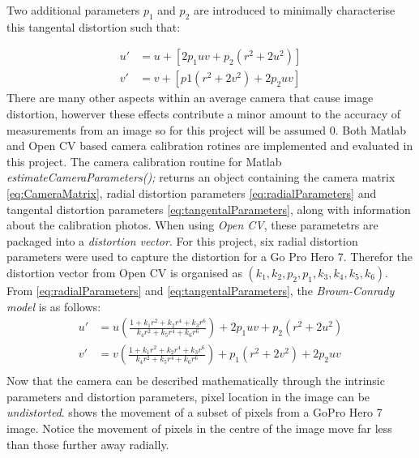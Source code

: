 \documentclass{UoNMCHA}
\numberwithin{equation}{section}
\begin{document}
Two additional parameters $p_{1}$ and $p_{2}$ are introduced to minimally characterise this tangental distortion such that:

\begin{equation}\label{eq:tangentalParameters}
	\begin{split}
		u' &= u + [2p_{1}uv + p_{2}(r^{2} + 2u^{2})]\\
		v' &= v  + [p1(r^{2} + 2v^2) + 2p_{2}uv]
	\end{split}
\end{equation}
There are many other aspects within an average camera that cause image distortion, howerver these effects contribute a minor amount to the accuracy of measurements from an image so for this project will be assumed $0$. Both Matlab and Open CV based camera calibration rotines are implemented and evaluated in this project. The camera calibration routine for Matlab \textit{estimateCameraParameters();} returns an object containing the camera matrix \ref{eq:CameraMatrix}, radial distortion parameters \ref{eq:radialParameters} and tangental distortion parameters \ref{eq:tangentalParameters}, along with information about the calibration photos. When using \textit{Open CV}, these parametetrs are packaged into a \textit{distortion vector}. For this project, six radial distortion parameters were used to capture the distortion for a Go Pro Hero 7. Therefor the distortion vector from Open CV is organised as $(k_{1}, k_{2}, p_{2}, p_{1}, k_{3}, k_{4}, k_{5}, k_{6})$.
From \cref{eq:radialParameters} and \cref{eq:tangentalParameters}, the \textit{Brown-Conrady model} is as follows:
\begin{equation}
	\begin{split}
		u' &= u\left(\frac{1  +k_{1}r^{2} + k_{2}r^{4} + k_{3}r^{6}}{k_{4}r^{2} + k_{5}r^{4} + k_{6}r^{6}}\right) + 2p_{1}uv + p_{2}(r^{2} + 2u^{2})\\
		v' &= v\left(\frac{1  +k_{1}r^{2} + k_{2}r^{4} + k_{3}r^{6}}{k_{4}r^{2} + k_{5}r^{4} + k_{6}r^{6}}\right)  + p_{1}(r^{2} + 2v^{2}) + 2p_{2}uv\\
	\end{split}
\end{equation}
Now that the camera can be described mathematically through the intrinsic parameters and distortion parameters, pixel location in the image can be \textit{undistorted}.  shows the movement of a subset of pixels from a GoPro Hero 7 image. Notice the movement of pixels in the centre of the image move far less than those further away radially.
\end{document}
